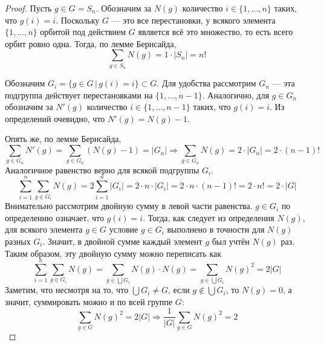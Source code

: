 \documentclass{article}
\theoremstyle{definition}
\theoremstyle{remark}
\newcommand{\Ra}{\Rightarrow}
\begin{document}
\begin{proof}
    Пусть $g \in G = S_n$. Обозначим за $N(g)$ количество $i \in \{1, \hdots, n\}$ таких, что $g(i) = i$. Поскольку $G$ --- это все перестановки, у всякого элемента $\{1, \hdots, n\}$ орбитой под действием $G$ является всё это множество, то есть всего орбит ровно одна. Тогда, по лемме Бернсайда,
    \begin{equation*}
        \sum_{g \in S_n} N(g) = 1 \cdot |S_n| = n!
    \end{equation*}

    Обозначим $G_i = \{ g\in G \,|\, g(i) = i \} \subset G$. Для удобства рассмотрим $G_n$ --- эта подгруппа действует перестановками на $\{1, \hdots, n-1\}$. Аналогично, для $g \in G_n$ обозначим за $N'(g)$ количество $i \in \{1, \hdots, n-1\}$ таких, что $g(i) = i$. Из определений очевидно, что $N'(g) = N(g) - 1$.

    Опять же, по лемме Бернсайда,
    \begin{equation*}
        \sum_{g \in G_n} N'(g) = \sum_{g \in G_n} (N(g) - 1) = |G_n| \Ra \sum_{g \in G_n} N(g) = 2 \cdot |G_n| = 2 \cdot (n-1)!
    \end{equation*}
    Аналогичное равенство верно для всякой подгруппы $G_i$.
    \begin{equation*}
        \sum_{i = 1}^{n} \sum_{g \in G_i} N(g) = 2 \sum_{i = 1}^{n} |G_i| = 2 \cdot n \cdot |G_i| = 2 \cdot n \cdot (n-1)! = 2 \cdot n! = 2 \cdot |G|
    \end{equation*}
    Внимательно рассмотрим двойную сумму в левой части равенства. $g \in G_i$ по определению означает, что $g(i) = i$. Тогда, как следует из определения $N(g)$, для всякого элемента $g \in G$ условие $g \in G_i$ выполнено в точности для $N(g)$ разных $G_i$. Значит, в двойной сумме каждый элемент $g$ был учтён $N(g)$ раз. Таким образом, эту двойную сумму можно переписать как
    \begin{equation*}
        \sum_{i = 1}^{n} \sum_{g \in G_i} N(g) = \sum_{g \in \bigcup G_i} N(g) \cdot N(g) = \sum_{g \in \bigcup G_i} N(g)^2 = 2 |G|
    \end{equation*}
    Заметим, что несмотря на то, что $\bigcup G_i \neq G$, если $g \notin \bigcup G_i$, то $N(g) = 0$, а значит, суммировать можно и по всей группе $G$:
    \begin{equation*}
        \sum_{g \in G} N(g)^2 = 2 |G| \Ra \frac{1}{|G|} \sum_{g \in G} N(g)^2 = 2
    \end{equation*}


\end{proof}
\end{document}
